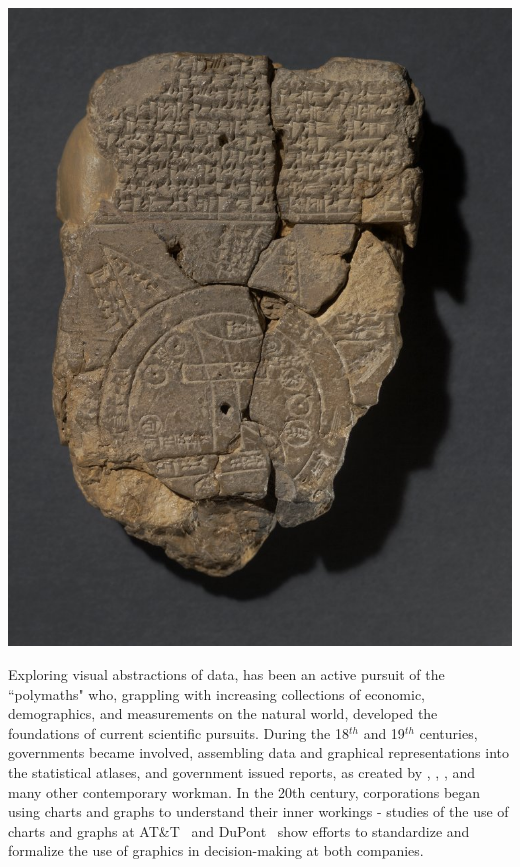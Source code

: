 \documentclass[letterpaper]{ar-1col}\usepackage[]{graphicx}\usepackage[]{color}
\begin{document}
\begin{minipage}{.35\textwidth}
\includegraphics[width=\textwidth]{figure/ImagoMundi.jpg}
\end{minipage}\hfill
\begin{minipage}{.6\textwidth}
\label{fig:imagomundi}
\end{minipage}
Exploring visual abstractions of data, has been an active pursuit of the ``polymaths" who, grappling with increasing collections of economic, demographics, and measurements on the natural world, developed the foundations of current scientific pursuits. During the 18$^{th}$ and 19$^{th}$ centuries, governments became involved, assembling data and graphical representations into the statistical atlases, and government issued reports, as created by \citet{Crome}, \citet{playfair1801statistical}, \citet{atlas}, and many other contemporary workman. In the 20th century, corporations began using charts and graphs to understand their inner workings - studies of the use of charts and graphs at AT\&T~\citep{chandarGraphStandardizationManagement2012} and DuPont~\citep{yatesGraphsManagerialTool1985a} show efforts to standardize and formalize the use of graphics in decision-making at both companies.
\end{document}
